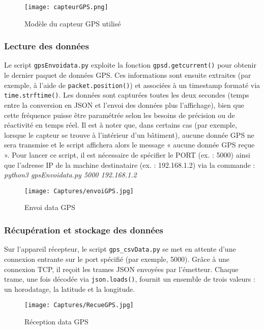 \documentclass[a4paper,11pt]{article}
\begin{document}
\begin{figure}[H]
    \centering
    \texttt{[image: capteurGPS.png]}
    \caption{Modèle du capteur GPS utilisé}
    \label{fig:enter-label}
\end{figure}

\FloatBarrier

\subsubsection{Lecture des données}
 Le script \texttt{gpsEnvoidata.py} exploite la fonction \texttt{gpsd.getcurrent()} pour obtenir le dernier paquet de données GPS. Ces informations sont ensuite extraites (par exemple, à l'aide de \texttt{packet.position()}) et associées à un timestamp formaté via \texttt{time.strftime()}. Les données sont capturées toutes les deux secondes (temps entre la conversion en JSON et l'envoi des données plus l'affichage), bien que cette fréquence puisse être paramétrée selon les besoins de précision ou de réactivité en temps réel. Il est à noter que, dans certains cas (par exemple, lorsque le capteur se trouve à l'intérieur d'un bâtiment), aucune donnée GPS ne sera transmise et le script affichera alors le message « aucune donnée GPS reçue ». Pour lancer ce script, il est nécessaire de spécifier le PORT (ex. : 5000) ainsi que l'adresse IP de la machine destinataire (ex. : 192.168.1.2) via la commande : \textit{python3 gpsEnvoidata.py 5000 192.168.1.2}

\begin{figure}[H]
    \centering
    \texttt{[image: Captures/envoiGPS.jpg]}
    \caption{Envoi data GPS}
    \label{fig:enter-label}
\end{figure}


\subsubsection{Récupération et stockage des données}
Sur l'appareil récepteur, le script \texttt{gps\_csvData.py} se met en attente d'une connexion entrante sur le port spécifié (par exemple, 5000). Grâce à une connexion TCP, il reçoit les trames JSON envoyées par l'émetteur. Chaque trame, une fois décodée via \texttt{json.loads()}, fournit un ensemble de trois valeurs : un horodatage, la latitude et la longitude. 

\begin{figure}[H]
    \centering
    \texttt{[image: Captures/RecueGPS.jpg]}
    \caption{Réception data GPS}
    \label{fig:enter-label}
\end{figure}
\end{document}
